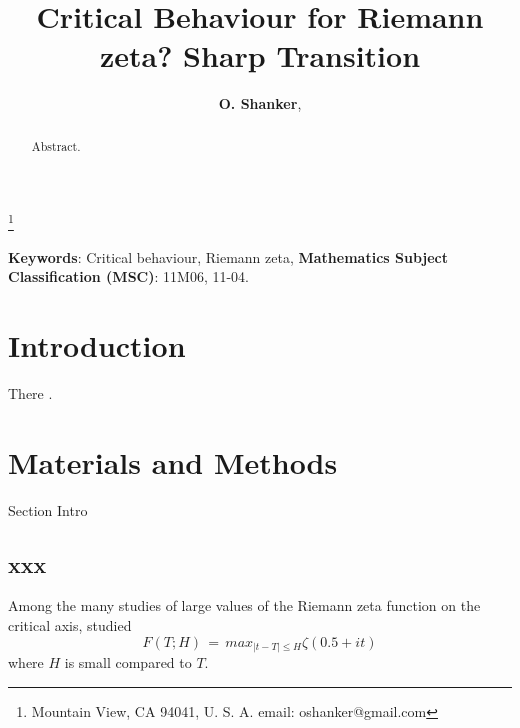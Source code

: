 \documentclass[twoside]{article}
\begin{document}


\newtheorem{theorem}{Theorem}[section]
\newtheorem{lemma}[theorem]{Lemma}

\theoremstyle{definition}
\newtheorem{definition}[theorem]{Definition}
\newtheorem{example}[theorem]{Example}
\newtheorem{xca}[theorem]{Exercise}

\theoremstyle{remark}
\newtheorem{remark}[theorem]{Remark}



\date{}
\lhead[]{}
\rhead[]{}

\title{\bf{Critical Behaviour for Riemann zeta? Sharp Transition}}

\maketitle


\author{{\textbf{O. Shanker}},}
\thanks{ Mountain View, CA 94041, U. S. A. email: oshanker@gmail.com}

\thispagestyle{fancy}

\begin{abstract}
Abstract. 

\end{abstract}
{\textbf {Keywords}:} Critical behaviour, Riemann zeta,  
{\textbf {Mathematics Subject Classification (MSC)}:} 11M06, 11-04.


\symbolfootnote[0]{*}


\section{Introduction}

 There .


\section{\label{sec2}Materials and Methods}
Section Intro

\subsection{\label{seckaratsuba}xxx}

Among the many studies of large values of the Riemann zeta function on the critical axis, 
studied 
\begin{equation}
F(T; H)  \, = \, max_{|t-T| \le H} \zeta ( 0.5+it ) 
\label{eqRie}
\end{equation}
where $H$ is small compared to $T$. 
\end{document}
